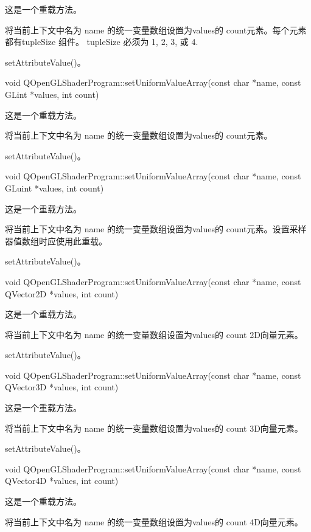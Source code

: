 这是一个重载方法。

将当前上下文中名为 name 的统一变量数组设置为values的 count元素。每个元素都有tupleSize 组件。 tupleSize 必须为 1, 2, 3, 或 4.

\begin{seeAlso}
setAttributeValue()。
\end{seeAlso}

void QOpenGLShaderProgram::setUniformValueArray(const char *name, const GLint *values, int count)

这是一个重载方法。

将当前上下文中名为 name 的统一变量数组设置为values的 count元素。


\begin{seeAlso}
setAttributeValue()。
\end{seeAlso}

void QOpenGLShaderProgram::setUniformValueArray(const char *name, const GLuint *values, int count)

这是一个重载方法。

将当前上下文中名为 name 的统一变量数组设置为values的 count元素。设置采样器值数组时应使用此重载。

\begin{seeAlso}
setAttributeValue()。
\end{seeAlso}

void QOpenGLShaderProgram::setUniformValueArray(const char *name, const QVector2D *values, int count)

这是一个重载方法。

将当前上下文中名为 name 的统一变量数组设置为values的 count 2D向量元素。


\begin{seeAlso}
setAttributeValue()。
\end{seeAlso}

void QOpenGLShaderProgram::setUniformValueArray(const char *name, const QVector3D *values, int count)

这是一个重载方法。

将当前上下文中名为 name 的统一变量数组设置为values的 count 3D向量元素。

\begin{seeAlso}
setAttributeValue()。
\end{seeAlso}

void QOpenGLShaderProgram::setUniformValueArray(const char *name, const QVector4D *values, int count)

这是一个重载方法。

将当前上下文中名为 name 的统一变量数组设置为values的 count 4D向量元素。

